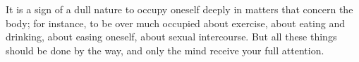 It is a sign of a dull nature  to occupy oneself deeply in matters that concern
the body; for  instance, to be over much occupied  about exercise, about eating
and drinking,  about easing  oneself, about sexual  intercourse. But  all these
things  should  be done  by  the  way, and  only  the  mind receive  your  full
attention.
